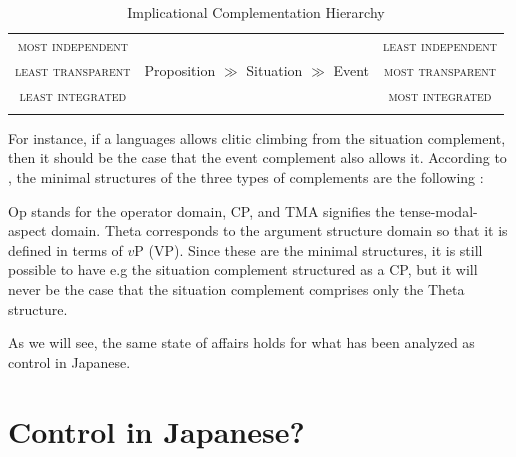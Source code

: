\documentclass[output=paper]{langsci/langscibook}
\begin{document}
\begin{table}
\caption{Implicational Complementation Hierarchy}
\label{shimamutab:1:ICH}
 \begin{tabular}{ccc} 
  \lsptoprule
   \textsc{most independent} &   & \textsc{least independent} \\ 
  \textsc{least transparent}  &   Proposition $\gg$ Situation $\gg$ Event  & \textsc{most transparent}  \\
   \textsc{least integrated}  &   &    \textsc{most integrated} \\
  \lspbottomrule
 \end{tabular}
\end{table}

\noindent For instance, if a languages allows clitic climbing from the situation complement, then it should be the case that the event complement also allows it. According to \citet{wurmbrandlohninger2020}, the minimal structures of the three types of complements are the following \citep[][33]{wurmbrandlohninger2020}:

\begin{multicols}{3}
\ea\label{shimamu4.1}
\begin{xlist} 
\ex {}
\ex {}
\ex {}
\end{xlist}
\z
\end{multicols}

\noindent Op stands for the operator domain, CP, and TMA signifies the tense-modal-aspect domain. Theta corresponds to the argument structure domain so that it is defined in terms of $v$P (VP). Since these are the minimal structures, it is still possible to have e.g the situation complement structured as a CP, but it will never be the case that the situation complement comprises only the Theta structure.

As we will see, the same state of affairs holds for what has been analyzed as control in Japanese.

\section{Control in Japanese?}\label{shimamuS3}
\end{document}
